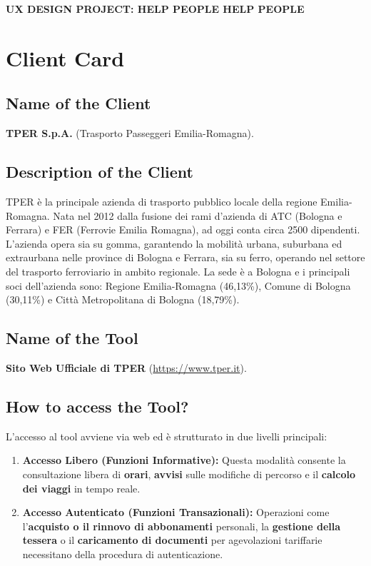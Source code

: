 \documentclass[11pt,a4paper]{article}
\begin{document}
\begin{tcolorbox}[colback=primaryColor,colframe=primaryColor,arc=3mm,halign=center,valign=center,height=2.5cm]
    \color{white}\LARGE\bfseries UX DESIGN PROJECT: HELP PEOPLE HELP PEOPLE \\[0.2cm]
\end{tcolorbox}

\vspace{0.5cm}

\section{Client Card}

\subsection{Name of the Client}
\textbf{TPER S.p.A.} (Trasporto Passeggeri Emilia-Romagna).

\subsection{Description of the Client}
TPER è la principale azienda di trasporto pubblico locale della regione Emilia-Romagna. Nata nel 2012 dalla fusione dei rami d'azienda di ATC (Bologna e Ferrara) e FER (Ferrovie Emilia Romagna), ad oggi conta circa 2500 dipendenti. L'azienda opera sia su gomma, garantendo la mobilità urbana, suburbana ed extraurbana nelle province di Bologna e Ferrara, sia su ferro, operando nel settore del trasporto ferroviario in ambito regionale.
La sede è a Bologna e i principali soci dell'azienda sono: Regione Emilia-Romagna (46,13\%), Comune di Bologna (30,11\%) e Città Metropolitana di Bologna (18,79\%).

\subsection{Name of the Tool}
\textbf{Sito Web Ufficiale di TPER} (\url{https://www.tper.it}).

\subsection{How to access the Tool?}
L'accesso al tool avviene via web ed è strutturato in due livelli principali:
\begin{enumerate}[leftmargin=*]
    \item \textbf{Accesso Libero (Funzioni Informative):} Questa modalità consente la consultazione libera di \textbf{orari}, \textbf{avvisi} sulle modifiche di percorso e il \textbf{calcolo dei viaggi} in tempo reale.
    \item \textbf{Accesso Autenticato (Funzioni Transazionali):} Operazioni come l'\textbf{acquisto o il rinnovo di abbonamenti} personali, la \textbf{gestione della tessera} o il \textbf{caricamento di documenti} per agevolazioni tariffarie necessitano della procedura di autenticazione.
\end{enumerate}
\end{document}
